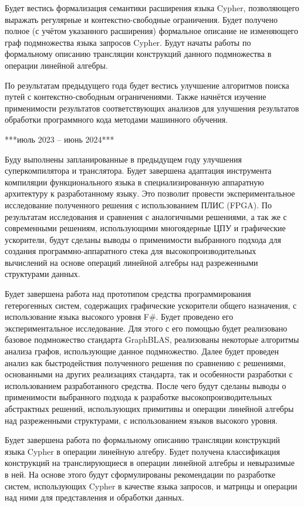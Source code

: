 \documentclass[12pt]{article}  %
\theoremstyle{remark}
\begin{document}
Будет вестись формализация семантики расширения языка Cypher, позволяющего выражать регулярные и контекстно-свободные ограничения. Будет получено полное (с учётом указанного расширения) формальное описание не изменяющего граф подмножества языка запросов Cypher. Будут начаты работы по формальному описанию трансляции конструкций данного подмножества в операции линейной алгебры.

По результатам предыдущего года будет вестись улучшение алгоритмов поиска путей с контекстно-свободным ограничениями. Также начнётся изучение применимости результатов соответствующих анализов для улучшения результатов обработки программного кода методами машинного обучения.

***июль 2023 -- июнь 2024***

Буду выполнены запланированные в предыдущем году улучшения суперкомпилятора и транслятора. Будет завершена адаптация инструмента компиляции функционального языка в специализированную аппаратную архитектуру к разработанному языку. Это позволит провести экспериментальное исследование полученного решения с использованием ПЛИС (FPGA). По результатам исследования и сравнения с аналогичными решениями, а так же с современными решениям, использующими многоядерные ЦПУ и графические ускорители, будут сделаны выводы о применимости выбранного подхода для создания программно-аппаратного стека для высокопроизводительных вычислений на основе операций линейной алгебры над разреженными структурами данных.

Будет завершена работа над прототипом средства программирования гетерогенных систем, содержащих графические ускорители общего назначения, с использование языка высокого уровня F#. Будет проведено его экспериментальное исследование. Для этого с его помощью будет реализовано базовое подмножество стандарта GraphBLAS, реализованы некоторые алгоритмы анализа графов, использующие данное подмножество. Далее будет проведен анализ как быстродействия полученного решения по сравнению с решениями, основанными на других реализациях стандарта, так и особенности разработки с использованием разработанного средства. После чего будут сделаны выводы о применимости выбранного подхода к разработке высокопроизводительных абстрактных решений, использующих примитивы и операции линейной алгебры над разреженными структурами, с использованием языков высокого уровня.

Будет завершена работа по формальному описанию трансляции конструкций языка Cypher в операции линейную алгебру. Будет получена классификация конструкций на транслирующиеся в операции линейной алгебры и невыразимые в ней. На основе этого будут сформулированы рекомендации по разработке систем, использующих Cypher в качестве языка запросов, и матрицы и операции над ними для представления и обработки данных.
\end{document}

